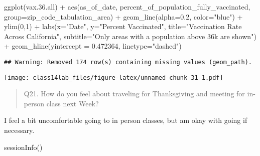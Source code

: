 \documentclass[
]{article}
\newenvironment{Shaded}{\begin{snugshade}}{\end{snugshade}}
\newcommand{\AttributeTok}[1]{\textcolor[rgb]{0.77,0.63,0.00}{#1}}
\newcommand{\DecValTok}[1]{\textcolor[rgb]{0.00,0.00,0.81}{#1}}
\newcommand{\FloatTok}[1]{\textcolor[rgb]{0.00,0.00,0.81}{#1}}
\newcommand{\FunctionTok}[1]{\textcolor[rgb]{0.00,0.00,0.00}{#1}}
\newcommand{\NormalTok}[1]{#1}
\newcommand{\SpecialCharTok}[1]{\textcolor[rgb]{0.00,0.00,0.00}{#1}}
\newcommand{\StringTok}[1]{\textcolor[rgb]{0.31,0.60,0.02}{#1}}
\begin{document}
\begin{Shaded}
\begin{Highlighting}[]
\FunctionTok{ggplot}\NormalTok{(vax.}\FloatTok{36.}\NormalTok{all) }\SpecialCharTok{+}
  \FunctionTok{aes}\NormalTok{(as\_of\_date,}
\NormalTok{      percent\_of\_population\_fully\_vaccinated, }
      \AttributeTok{group=}\NormalTok{zip\_code\_tabulation\_area) }\SpecialCharTok{+}
  \FunctionTok{geom\_line}\NormalTok{(}\AttributeTok{alpha=}\FloatTok{0.2}\NormalTok{, }\AttributeTok{color=}\StringTok{"blue"}\NormalTok{) }\SpecialCharTok{+}
  \FunctionTok{ylim}\NormalTok{(}\DecValTok{0}\NormalTok{,}\DecValTok{1}\NormalTok{) }\SpecialCharTok{+}
  \FunctionTok{labs}\NormalTok{(}\AttributeTok{x=}\StringTok{"Date"}\NormalTok{, }\AttributeTok{y=}\StringTok{"Percent Vaccinated"}\NormalTok{,}
       \AttributeTok{title=}\StringTok{"Vaccination Rate Across California"}\NormalTok{,}
       \AttributeTok{subtitle=}\StringTok{"Only areas with a population above 36k are shown"}\NormalTok{) }\SpecialCharTok{+}
  \FunctionTok{geom\_hline}\NormalTok{(}\AttributeTok{yintercept =} \FloatTok{0.472364}\NormalTok{, }\AttributeTok{linetype=}\StringTok{"dashed"}\NormalTok{)}
\end{Highlighting}
\end{Shaded}

\begin{verbatim}
## Warning: Removed 174 row(s) containing missing values (geom_path).
\end{verbatim}

\texttt{[image: class14lab\_files/figure-latex/unnamed-chunk-31-1.pdf]}

\begin{quote}
Q21. How do you feel about traveling for Thanksgiving and meeting for
in-person class next Week?
\end{quote}

I feel a bit uncomfortable going to in person classes, but am okay with
going if necessary.

\begin{Shaded}
\begin{Highlighting}[]
\FunctionTok{sessionInfo}\NormalTok{()}
\end{Highlighting}
\end{Shaded}
\end{document}
